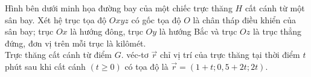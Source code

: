 \begin{ex}%
	Hình bên dưới minh họa đường bay của một chiếc trực thăng $H$ cất cánh từ một sân bay. Xét hệ trục tọa độ $Oxyz$ có gốc tọa độ $O$ là chân tháp điều khiển của sân bay; trục $Ox$ là hướng đông, trục $Oy$ là hướng Bắc và trục $Oz$ là trục thẳng đứng, đơn vị trên mỗi trục là kilômét.\\
	Trực thăng cất cánh từ điểm $G$. véc-tơ $\vec{r}$ chỉ vị trí của trực thăng tại thời điểm $t$ phút sau khi cất cánh $(t\ge 0)$ có tọa độ là $\vec{r}=(1+t; 0,5+2t; 2t)$.
	\begin{center}
\end{center}
\end{ex}
